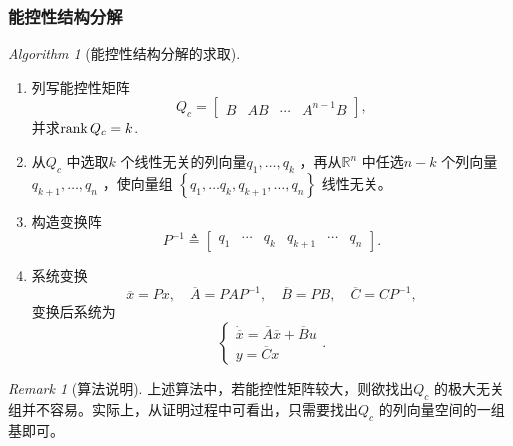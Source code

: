\documentclass[14pt,a4paper]{article}
\theoremstyle{plain}
\theoremstyle{definition}
\theoremstyle{remark}
\newtheorem{rmk}{Remark}[section]
\theoremstyle{plain}
\theoremstyle{plain}
\theoremstyle{plain}
\theoremstyle{definition}
\theoremstyle{remark}
\newtheorem{alg}{Algorithm}[section]
\numberwithin{equation}{section}
\begin{document}
			\subsubsection{能控性结构分解}%
			\label{ssub:能控性结构分解}
			
				\begin{alg}[能控性结构分解的求取]  
				\label{alg:能控性结构分解的求取}
					\ 
					\begin{enumerate}
						\item 列写能控性矩阵 
							\[
							Q_c = \begin{bmatrix}
								B & AB & \cdots & A^{n-1}B 
							\end{bmatrix} 
							,\] 
							并求$\mathop{\textnormal{rank}} Q_c = k$. 
						\item 从$Q_c$ 中选取$k$ 个线性无关的列向量$q_1,\ldots ,q_{k}$ ，再从$\mathbb{R}^{n}$ 中任选$n-k$ 个列向量$q_{k+1},\ldots ,q_{n}$ ，使向量组 $\left\{ q_1,\ldots q_{k},q_{k+1},\ldots ,q_{n} \right\}$ 线性无关。 
						\item 构造变换阵
							\[
							P^{-1} \triangleq \begin{bmatrix}
								q_1 & \cdots &q_{k} & q_{k+1} & \cdots & q_{n} 
							\end{bmatrix} 
							.\] 
						\item 系统变换
							\[
							\overline{x}=Px,\quad\overline{A}=PA P^{-1},\quad \overline{B}=PB,\quad \overline{C}=CP^{-1}
							,\] 
							变换后系统为
							\[
							\begin{cases}
								\dot{\overline{x}} = \overline{A} \overline{x} + \overline{B} u \\ 
								y = \overline{C} x
							\end{cases} 
							.\] 
					\end{enumerate} 
				\end{alg} 

				\begin{rmk}[算法说明]  
				\label{rmk:算法说明}
					上述算法中，若能控性矩阵较大，则欲找出$Q_c$ 的极大无关组并不容易。实际上，从证明过程中可看出，只需要找出$Q_c$ 的列向量空间的一组基即可。
				\end{rmk} 
			
\end{document}
